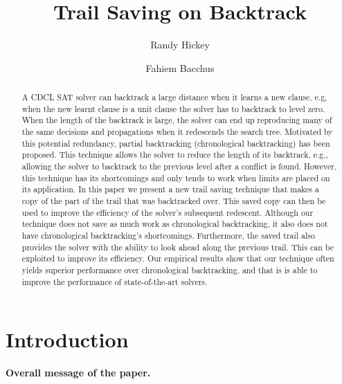 \documentclass[runningheads]{llncs}
\title{Trail Saving on Backtrack}
\author{Randy Hickey \and Fahiem Bacchus}
\institute{Department of Computer Science, University of Toronto, Canada\\
  \email{rgh000@gmail.com, fbacchus@cs.toronto.edu}}
\newcommand{\sat}{SAT\xspace}
\begin{document}
\maketitle
\begin{abstract}
    A CDCL \sat solver can backtrack a large distance when it learns a
    new clause, e.g, when the new learnt clause is a unit clause the
    solver has to backtrack to level zero. When the length of the
    backtrack is large, the solver can end up reproducing many of the
    same decisions and propagations when it redescends the search
    tree. Motivated by this potential redundancy, partial backtracking
    (chronological backtracking) has been proposed. This technique
    allows the solver to reduce the length of its backtrack, e.g.,
    allowing the solver to backtrack to the previous level after a
    conflict is found. However, this technique has its shortcomings
    and only tends to work when limits are placed on its
    application. In this paper we present a new trail saving technique
    that makes a copy of the part of the trail that was backtracked
    over. This saved copy can then be used to improve the efficiency
    of the solver's subsequent redescent. Although our technique does
    not save as much work as chronological backtracking, it also does
    not have chronological backtracking's shortcomings. Furthermore,
    the saved trail also provides the solver with the ability to look
    ahead along the previous trail. This can be exploited to improve
    its efficiency. Our empirical results show that our technique
    often yields superior performance over chronological backtracking,
    and that is is able to improve the performance of state-of-the-art
    solvers.

\end{abstract}

\section{Introduction}
\textbf{Overall message of the paper.}


\end{document}
